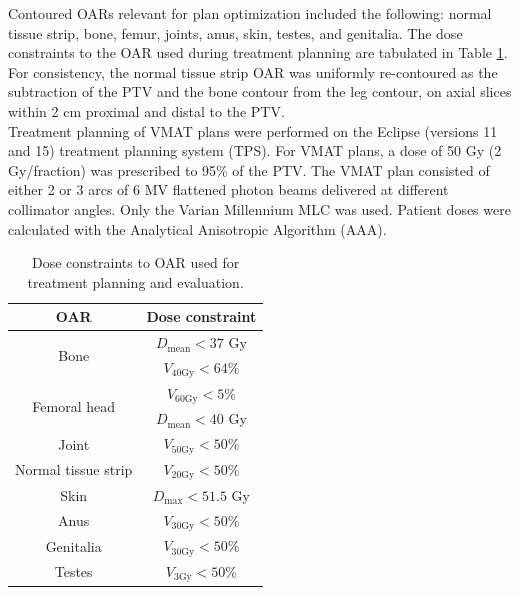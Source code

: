 \documentclass[aapm,graphicx,superscriptaddress]{revtex4-1}
\begin{document}
Contoured OARs relevant for plan optimization included the following: normal tissue strip, bone, femur, joints, anus, skin, testes, and genitalia. The dose constraints to the OAR used during treatment planning are tabulated in Table \ref{tab:OARconstraints}. For consistency, the normal tissue strip OAR was uniformly re-contoured as the subtraction of the PTV and the bone contour from the leg contour, on axial slices within 2 cm proximal and distal to the PTV.\\ 
Treatment planning of VMAT plans were performed on the Eclipse (versions 11 and 15) treatment planning system (TPS). For VMAT plans, a dose of 50 Gy (2 Gy/fraction) was prescribed to 95\% of the PTV. The VMAT plan consisted of either 2 or 3 arcs of 6 MV flattened photon beams delivered at different collimator angles. Only the Varian Millennium MLC was used. Patient doses were calculated with the Analytical Anisotropic Algorithm (AAA). \\

\begin{table}[htb]
    \centering
    \caption{Dose constraints to OAR used for treatment planning and evaluation.}
    \begin{tabular}{cc}
        OAR & Dose constraint \\
        \hline\hline
        \multirow{2}{*}{Bone} & $D_\text{mean} < 37$ Gy \\
            & $V_\text{40Gy} < 64\%$\\
        \multirow{2}{*}{Femoral head} & $V_\text{60Gy} < 5\%$\\
        & $D_\text{mean} < 40$ Gy \\
        Joint & $V_\text{50Gy} < 50\%$\\
        Normal tissue strip &  $V_\text{20Gy} < 50\%$\\
        Skin & $D_\text{max}<51.5$ Gy\\
        Anus & $V_\text{30Gy} < 50\%$\\
        Genitalia & $V_\text{30Gy} < 50\%$\\
        Testes & $V_\text{3Gy} < 50\%$\\
    \end{tabular}
    \label{tab:OARconstraints}
\end{table}
\end{document}
